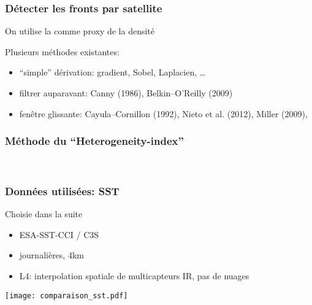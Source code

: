 \documentclass[11pt, french, aspectratio=32]{beamer}
\begin{document}
\begin{frame}
  \frametitle{Détecter les fronts par satellite}

  \begin{block}{}
    On utilise la  comme proxy de la densité
  \end{block}

  \begin{block}{}
    Plusieurs méthodes existantes:
    \begin{itemize}
            \setlength{\itemsep}{1.2em}
      \item “simple” dérivation: gradient, Sobel, Laplacien, \dots
      \item filtrer auparavant: Canny (1986), Belkin--O'Reilly (2009)
      \item fenêtre glissante: Cayula--Cornillon (1992), Nieto et al. (2012), Miller (2009), 
    \end{itemize}
  \end{block}
\end{frame}


\begin{frame}
  \frametitle{Méthode du “Heterogeneity-index”}
  \\[1em]
\end{frame}


\begin{frame}
  \frametitle{Données utilisées: SST}

  \begin{block}{Choisie dans la suite}
    \begin{itemize}
      \item ESA-SST-CCI / C3S
      \item journalières, 4km
      \item L4: interpolation spatiale de multicapteurs IR, pas de nuages
    \end{itemize}
  \end{block}

  \vfill

  \texttt{[image: comparaison\_sst.pdf]}

\end{frame}
\end{document}
